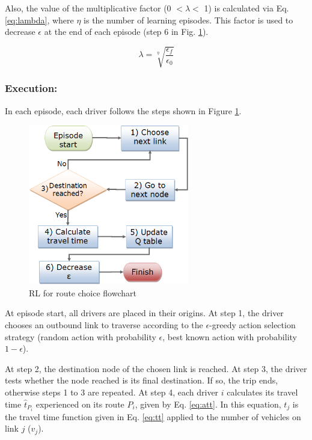 \documentclass{RITA}
\newcommand{\route}[1]{\ensuremath{P_#1}}	%
\newcommand{\travTime}{\ensuremath{t_j}} 	%
\newcommand{\veh}{\ensuremath{v}}		%
\newcommand{\att}[1]{\ensuremath{\hat{t}_{#1}}}		%
\newcommand{\numepis}{\ensuremath{\eta}}	%
\begin{document}
Also, the value of the multiplicative factor (0 $< \lambda <$ 1) is calculated via Eq. \eqref{eq:lambda}, where $\numepis$ is the number of learning episodes. This factor is used to decrease $\epsilon$ at the end of each episode (step 6 in Fig. \ref{fig:flowchart}).

\begin{equation}
\label{eq:lambda}
\lambda = \sqrt[\numepis]{\frac{\epsilon_f}{\epsilon_0}}
\end{equation}

\subsubsection{Execution:}

In each episode, each driver follows the steps shown in Figure \ref{fig:flowchart}.

\begin{figure}[ht]
    \centerline{\includegraphics[width=7cm]{img/flowchart3.png}}
    \caption{RL for route choice flowchart}
    \label{fig:flowchart}
\end{figure}

At episode start, all drivers are placed in their origins. At step 1, the driver chooses an outbound link to traverse according to the $\epsilon$-greedy action selection strategy (random action with probability $\epsilon$, best known action with probability $1 - \epsilon$). %

 At step 2, the destination node of the chosen link is reached. At step 3, the driver tests whether the node reached is its final destination. If so, the trip ends, otherwise steps 1 to 3 are repeated. At step 4, each driver $i$ calculates its travel time $\att{\route{i}}$ experienced on its route $\route{i}$, given by Eq. \eqref{eq:att}. In this equation, $\travTime$ is the travel time function given in Eq. \eqref{eq:tt} applied to the number of vehicles on link $j$ ($\veh_j$).
\end{document}
